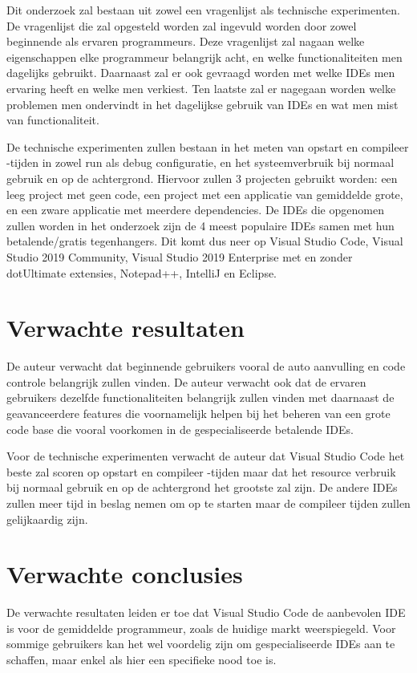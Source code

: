 Dit onderzoek zal bestaan uit zowel een vragenlijst als technische experimenten. De vragenlijst die zal opgesteld worden zal ingevuld worden door zowel beginnende als ervaren programmeurs. Deze vragenlijst zal nagaan welke eigenschappen elke programmeur belangrijk acht, en welke functionaliteiten men dagelijks gebruikt. Daarnaast zal er ook gevraagd worden met welke IDEs men ervaring heeft en welke men verkiest. Ten laatste zal er nagegaan worden welke problemen men ondervindt in het dagelijkse gebruik van IDEs en wat men mist van functionaliteit.

De technische experimenten zullen bestaan in het meten van opstart en compileer -tijden in zowel run als debug configuratie, en het systeemverbruik bij normaal gebruik en op de achtergrond. Hiervoor zullen 3 projecten gebruikt worden: een leeg project met geen code, een project met een applicatie van gemiddelde grote, en een zware applicatie met meerdere dependencies. 
De IDEs die opgenomen zullen worden in het onderzoek zijn de 4 meest populaire IDEs \autocite{StackOverflow2021} samen met hun betalende/gratis tegenhangers. Dit komt dus neer op Visual Studio Code, Visual Studio 2019 Community, Visual Studio 2019 Enterprise met en zonder dotUltimate extensies, Notepad++, IntelliJ en Eclipse. 


\section{Verwachte resultaten}
\label{sec:verwachte_resultaten}

De auteur verwacht dat beginnende gebruikers vooral de auto aanvulling en code controle belangrijk zullen vinden. De auteur verwacht ook dat de ervaren gebruikers dezelfde functionaliteiten belangrijk zullen vinden met daarnaast de geavanceerdere features die voornamelijk helpen bij het beheren van een grote code base die vooral voorkomen in de gespecialiseerde betalende IDEs.

Voor de technische experimenten verwacht de auteur dat Visual Studio Code het beste zal scoren op opstart en compileer -tijden maar dat het resource verbruik bij normaal gebruik en op de achtergrond het grootste zal zijn. De andere IDEs zullen meer tijd in beslag nemen om op te starten maar de compileer tijden zullen gelijkaardig zijn.


\section{Verwachte conclusies}
\label{sec:verwachte_conclusies}

De verwachte resultaten leiden er toe dat Visual Studio Code de aanbevolen IDE is voor de gemiddelde programmeur, zoals de huidige markt weerspiegeld. Voor sommige gebruikers kan het wel voordelig zijn om gespecialiseerde IDEs aan te schaffen, maar enkel als hier een specifieke nood toe is.


